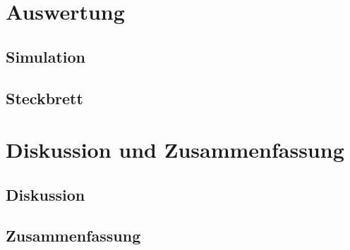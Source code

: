 \documentclass[12pt,english,ngerman]{scrartcl}
\begin{document}
\section{Auswertung}\label{sec:Auswertung}

\subsection{Simulation}

\subsection{Steckbrett}

\section{Diskussion und Zusammenfassung}\label{sec:Diskussion} 
\subsection{Diskussion}


\subsection{Zusammenfassung}

\newpage

\printbibliography

\listoffigures

\listoftables
\end{document}
